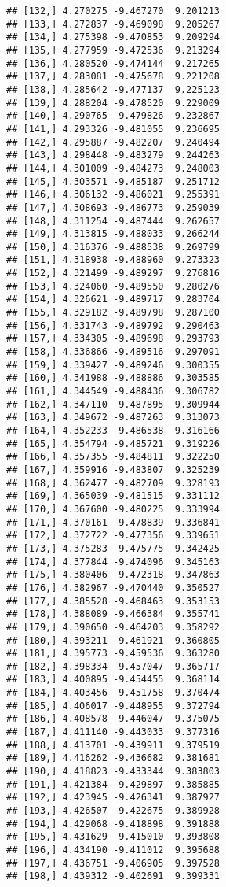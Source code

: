 \documentclass[]{book}
\theoremstyle{definition}
\theoremstyle{definition}
\theoremstyle{definition}
\theoremstyle{remark}
\begin{document}
\begin{verbatim}
## [132,] 4.270275 -9.467270  9.201213
## [133,] 4.272837 -9.469098  9.205267
## [134,] 4.275398 -9.470853  9.209294
## [135,] 4.277959 -9.472536  9.213294
## [136,] 4.280520 -9.474144  9.217265
## [137,] 4.283081 -9.475678  9.221208
## [138,] 4.285642 -9.477137  9.225123
## [139,] 4.288204 -9.478520  9.229009
## [140,] 4.290765 -9.479826  9.232867
## [141,] 4.293326 -9.481055  9.236695
## [142,] 4.295887 -9.482207  9.240494
## [143,] 4.298448 -9.483279  9.244263
## [144,] 4.301009 -9.484273  9.248003
## [145,] 4.303571 -9.485187  9.251712
## [146,] 4.306132 -9.486021  9.255391
## [147,] 4.308693 -9.486773  9.259039
## [148,] 4.311254 -9.487444  9.262657
## [149,] 4.313815 -9.488033  9.266244
## [150,] 4.316376 -9.488538  9.269799
## [151,] 4.318938 -9.488960  9.273323
## [152,] 4.321499 -9.489297  9.276816
## [153,] 4.324060 -9.489550  9.280276
## [154,] 4.326621 -9.489717  9.283704
## [155,] 4.329182 -9.489798  9.287100
## [156,] 4.331743 -9.489792  9.290463
## [157,] 4.334305 -9.489698  9.293793
## [158,] 4.336866 -9.489516  9.297091
## [159,] 4.339427 -9.489246  9.300355
## [160,] 4.341988 -9.488886  9.303585
## [161,] 4.344549 -9.488436  9.306782
## [162,] 4.347110 -9.487895  9.309944
## [163,] 4.349672 -9.487263  9.313073
## [164,] 4.352233 -9.486538  9.316166
## [165,] 4.354794 -9.485721  9.319226
## [166,] 4.357355 -9.484811  9.322250
## [167,] 4.359916 -9.483807  9.325239
## [168,] 4.362477 -9.482709  9.328193
## [169,] 4.365039 -9.481515  9.331112
## [170,] 4.367600 -9.480225  9.333994
## [171,] 4.370161 -9.478839  9.336841
## [172,] 4.372722 -9.477356  9.339651
## [173,] 4.375283 -9.475775  9.342425
## [174,] 4.377844 -9.474096  9.345163
## [175,] 4.380406 -9.472318  9.347863
## [176,] 4.382967 -9.470440  9.350527
## [177,] 4.385528 -9.468463  9.353153
## [178,] 4.388089 -9.466384  9.355741
## [179,] 4.390650 -9.464203  9.358292
## [180,] 4.393211 -9.461921  9.360805
## [181,] 4.395773 -9.459536  9.363280
## [182,] 4.398334 -9.457047  9.365717
## [183,] 4.400895 -9.454455  9.368114
## [184,] 4.403456 -9.451758  9.370474
## [185,] 4.406017 -9.448955  9.372794
## [186,] 4.408578 -9.446047  9.375075
## [187,] 4.411140 -9.443033  9.377316
## [188,] 4.413701 -9.439911  9.379519
## [189,] 4.416262 -9.436682  9.381681
## [190,] 4.418823 -9.433344  9.383803
## [191,] 4.421384 -9.429897  9.385885
## [192,] 4.423945 -9.426341  9.387927
## [193,] 4.426507 -9.422675  9.389928
## [194,] 4.429068 -9.418898  9.391888
## [195,] 4.431629 -9.415010  9.393808
## [196,] 4.434190 -9.411012  9.395688
## [197,] 4.436751 -9.406905  9.397528
## [198,] 4.439312 -9.402691  9.399331

\end{verbatim}
\end{document}
